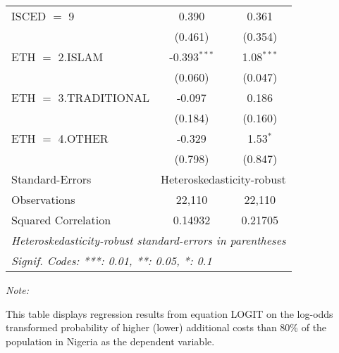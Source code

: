 \begin{table}[htbp!]
\begin{adjustbox}{width = 1\textwidth, max height = 0.95\textheight, center}
\begin{threeparttable}[b]
\begin{tabular}{lcc}
            ISCED $=$ 9           & 0.390          & 0.361\\   
                                  & (0.461)        & (0.354)\\   
            ETH $=$ 2.ISLAM       & -0.393$^{***}$ & 1.08$^{***}$\\   
                                  & (0.060)        & (0.047)\\   
            ETH $=$ 3.TRADITIONAL & -0.097         & 0.186\\   
                                  & (0.184)        & (0.160)\\   
            ETH $=$ 4.OTHER       & -0.329         & 1.53$^{*}$\\   
                                  & (0.798)        & (0.847)\\   
            \midrule 
            Standard-Errors & \multicolumn{2}{c}{Heteroskedasticity-robust} \\ 
            Observations          & 22,110         & 22,110\\  
            Squared Correlation   & 0.14932        & 0.21705\\  
            \midrule \midrule
            \multicolumn{3}{l}{\emph{Heteroskedasticity-robust standard-errors in parentheses}}\\
            \multicolumn{3}{l}{\emph{Signif. Codes: ***: 0.01, **: 0.05, *: 0.1}}\\
         \end{tabular}
         
         \begin{tablenotes}\item \medskip \textit{Note:}
            \item This table displays regression results from equation LOGIT on the log-odds transformed probability of higher (lower) additional costs than 80\% of the population in Nigeria as the dependent variable. 
         \end{tablenotes}
      \end{threeparttable}
   \end{adjustbox}
\end{table}


